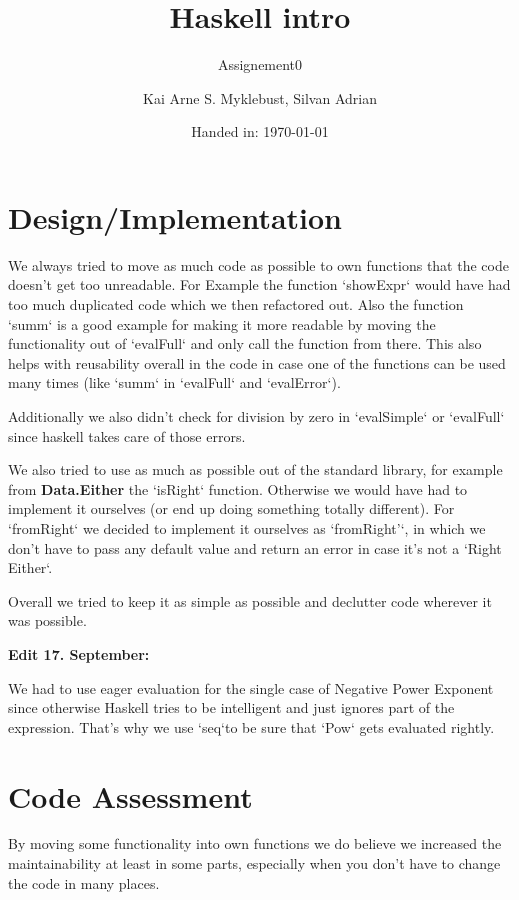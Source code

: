 \documentclass[12pt,a4paper]{article}
\begin{document}
\title{Haskell intro}
\subtitle{Assignement0}

\author{Kai Arne S. Myklebust, Silvan Adrian}
\date{Handed in: \today}
	
\maketitle
\tableofcontents

\section{Design/Implementation}
We always tried to move as much code as possible to own functions that the code doesn't get too unreadable.
For Example the function `showExpr` would have had too much duplicated code which we then refactored out.
Also the function `summ` is a good example for making it more readable by moving the functionality out of `evalFull` and only call the function from there.
This also helps with reusability overall in the code in case one of the functions can be used many times (like `summ` in `evalFull` and `evalError`).

Additionally we also didn't check for division by zero in `evalSimple` or `evalFull` since haskell takes care of those errors.

We also tried to use as much as possible out of the standard library, for example from \textbf{Data.Either} the `isRight` function. Otherwise we would have had to implement it ourselves (or end up doing something totally different). For `fromRight` we decided to implement it ourselves as `fromRight'`, in which we don't have to pass any default value and return an error in case it's not a `Right Either`.

Overall we tried to keep it as simple as possible and declutter code wherever it was possible.

\textbf{Edit 17. September:}

We had to use eager evaluation for the single case of Negative Power Exponent since otherwise Haskell tries to be intelligent and just ignores part of the expression.
That's why we use `seq`to be sure that `Pow` gets evaluated rightly.



\section{Code Assessment}

By moving some functionality into own functions we do believe we increased the maintainability at least in some parts, especially when you don't have to change the code in many places.
\end{document}
